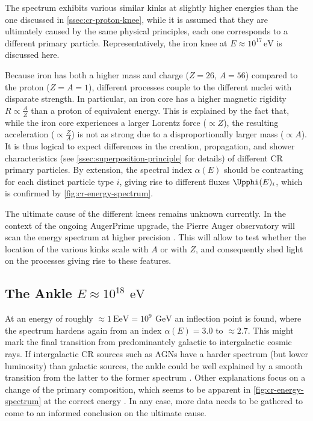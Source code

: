 The spectrum exhibits various similar kinks at slightly higher energies than the one discussed in \autoref{ssec:cr-proton-knee}, while it is assumed that they are 
ultimately caused by the same physical principles, each one corresponds to a different primary particle. Representatively, the iron knee at 
$E \approx 10^{17}\,\text{eV}$ is discussed here. 

Because iron has both a higher mass and charge ($Z = 26$, $A = 56$) compared to the proton ($Z = A = 1$), different processes couple to the different nuclei with 
disparate strength. In particular, an iron core has a higher magnetic rigidity $R \propto \frac{A}{Z}$ than a proton of equivalent energy. This is explained by the
fact that, while the iron core experiences a larger Lorentz force ($\propto Z$), the resulting acceleration ($\propto \frac{Z}{A}$) is not as strong due to a
disproportionally larger mass ($\propto A$). It is thus logical to expect differences in the creation, propagation, and shower characteristics 
(see \autoref{ssec:superposition-principle} for details) of different CR primary particles. By extension, the spectral index $\alpha(E)$ should be contrasting for 
each distinct particle type $i$, giving rise to different fluxes $\Upphi(E)_i$, which is confirmed by \autoref{fig:cr-energy-spectrum}.

The ultimate cause of the different knees remains unknown currently. In the context of the ongoing AugerPrime upgrade, the Pierre Auger observatory will scan the
energy spectrum at higher precision \cite{castellina2019augerprime}. This will allow to test whether the location of the various kinks scale with $A$ or with $Z$, 
and consequently shed light on the processes giving rise to these features.

\subsection{The Ankle $E \approx 10^{18}\,\SI{}{\electronvolt}$}
\label{ssec:cr-ankle}

At an energy of roughly $\approx\SI{1}{\exa\electronvolt} = 10^9\,\SI{}{\giga\electronvolt}$ an inflection point is found, where the spectrum hardens again from an 
index $\alpha(E) = 3.0$ to $\approx 2.7$. This might mark the final transition from predominantely galactic to intergalactic cosmic rays. If intergalactic CR 
sources such as AGNs have a harder spectrum (but lower luminosity) than galactic sources, the ankle could be well explained by a smooth transition from the latter to 
the former spectrum \cite{aloisio2007dip}. Other explanations focus on a change of the primary composition, which seems to be apparent in 
\autoref{fig:cr-energy-spectrum} at the correct energy \cite{allard2012extragalactic}. In any case, more data needs to be gathered to come to an informed 
conclusion on the ultimate cause.

